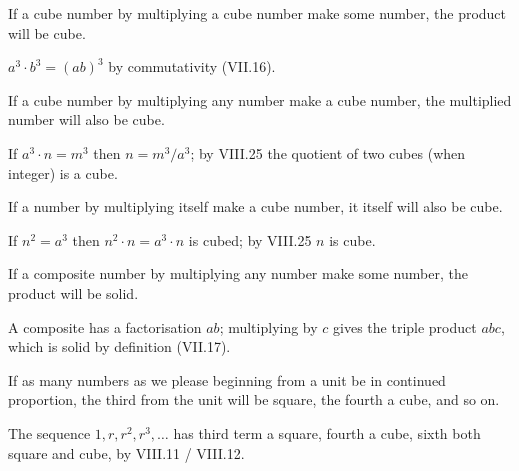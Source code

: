 \begin{claim}
\label{prop:IX.4}
If a cube number by multiplying a cube number make some number, the
product will be cube.
\end{claim}
\begin{evidence}[Proof of IX.4]
\label{ev:IX.4}
$a^3 \cdot b^3 = (ab)^3$ by commutativity (VII.16).
\end{evidence}

\begin{claim}
\label{prop:IX.5}
If a cube number by multiplying any number make a cube number, the
multiplied number will also be cube.
\end{claim}
\begin{evidence}[Proof of IX.5]
\label{ev:IX.5}
If $a^3 \cdot n = m^3$ then $n = m^3 / a^3$; by VIII.25 the quotient
of two cubes (when integer) is a cube.
\end{evidence}

\begin{claim}
\label{prop:IX.6}
If a number by multiplying itself make a cube number, it itself will
also be cube.
\end{claim}
\begin{evidence}[Proof of IX.6]
\label{ev:IX.6}
If $n^2 = a^3$ then $n^2 \cdot n = a^3 \cdot n$ is cubed; by VIII.25
$n$ is cube.
\end{evidence}

\begin{claim}
\label{prop:IX.7}
If a composite number by multiplying any number make some number,
the product will be solid.
\end{claim}
\begin{evidence}[Proof of IX.7]
\label{ev:IX.7}
A composite has a factorisation $ab$; multiplying by $c$ gives the
triple product $abc$, which is solid by definition (VII.17).
\end{evidence}

\begin{claim}
\label{prop:IX.8}
If as many numbers as we please beginning from a unit be in continued
proportion, the third from the unit will be square, the fourth a
cube, and so on.
\end{claim}
\begin{evidence}[Proof of IX.8]
\label{ev:IX.8}
The sequence $1, r, r^2, r^3, \dots$ has third term a square, fourth
a cube, sixth both square and cube, by VIII.11 / VIII.12.
\end{evidence}

